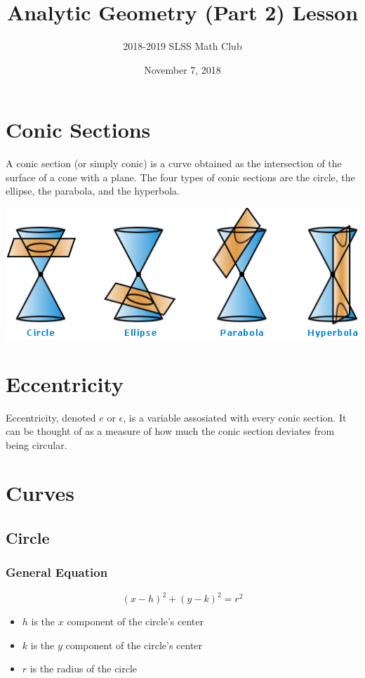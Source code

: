 \documentclass[12pt]{article}
\title{Analytic Geometry (Part 2) Lesson\vspace{-3mm}}
\author{2018-2019 SLSS Math Club\vspace{-5mm}}
\date{November 7, 2018\vspace{-5mm}}
\begin{document}
\maketitle
\section{Conic Sections}
A conic section (or simply conic) is a curve obtained as the intersection of the surface of a cone with a plane. The four types of conic sections are the circle, the ellipse, the parabola, and the hyperbola. \vspace{-3mm}

\begin{center}
    \includegraphics[scale = 1]{Graphics/Week_5/conic_sections.png}
\end{center}

\section{Eccentricity}
Eccentricity, denoted $e$ or $\epsilon$, is a variable assosiated with every conic section. It can be thought of as a measure of how much the conic section deviates from being circular. \vspace{-3mm}

\section{Curves}
\subsection{Circle}
\subsubsection{General Equation}
\begin{equation*}
    (x - h)^2 + (y - k)^2 = r^2
\end{equation*}
\begin{itemize}
    \item $h$ is the $x$ component of the circle's center
    \item $k$ is the $y$ component of the circle's center
    \item $r$ is the radius of the circle
\end{itemize}
\end{document}
